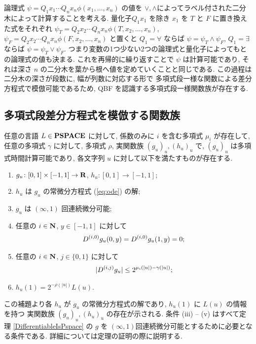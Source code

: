 論理式 $\psi = Q_1 x_1 \cdots Q_n x_n \phi(x_1, \dots, x_n)$ の値を
$\vee, \wedge$によってラベル付された二分木によって計算することを考える. 
量化子$Q_1 x_1$ を除き $x_1$ を $T$ と $F$ に置き換えた式をそれぞれ
$\psi_T = Q_2 x_2 \cdots Q_n x_n \phi(T, x_2, \dots, x_n)$,
$\psi_F = Q_2 x_2 \cdots Q_n x_n \phi(F, x_2, \dots, x_n)$ と置くと
$Q_1=\forall$ ならば $\psi = \psi_T \wedge \psi_F$, 
$Q_1=\exists$ ならば $\psi = \psi_T \vee \psi_F$.
つまり変数の1つ少ない2つの論理式と量化子によってもとの論理式の値も決まる.
これを再帰的に繰り返すことで $\psi$ は計算可能であり, 
それは深さ $n$ の二分木を葉から根へ値を定めていくことと同じである.
この過程は二分木の深さが段数に, 幅が列数に対応する形で
多項式段一様な関数による差分方程式で模倣可能であるため,
\textsf{QBF} を認識する多項式段一様関数族が存在する.


\subsection{多項式段差分方程式を模倣する関数族}


\begin{lemma}
 \label{DifferentiableFamily}
 任意の言語 $L \in \mathbf{PSPACE}$ に対して, 
 係数のみに $i$ を含む多項式 $\mu_i$ が存在して,
 任意の多項式 $\gamma$ に対して,
 多項式 $\rho$, 実関数族 $(g_u)_u, (h_u)_u$ で, 
 $(g_u)_u$ は多項式時間計算可能であり,
 各文字列 $u$ に対して以下を満たすものが存在する.
 \begin{enumerate}
  \item $g_u\colon [0,1] \times [-1,1]\to \mathbf R$, $h_u\colon [0,1] \to [-1,1]$;
  \item $h_u$ は $g_u$ の常微分方程式 (\ref{eq:ode}) の解; 
  \item $g_u$ は $(\infty, 1)$ 回連続微分可能;
  \item 任意の $i \in \mathbf N$, $y \in [-1,1]$ に対して
	\begin{equation*}
	 D ^{(i, 0)} g_u(0,y) = D ^{(i, 0)} g_u(1,y) = 0;
	\end{equation*}
  \item \label{enum:infty1}
	任意の $i \in \mathbf N$, $j \in \{0,1\}$ に対して
	\begin{equation*}
	 |D ^{(i,j)} g_u| \leq 2^{\mu_i (|u|) - \gamma(|u|)};
	\end{equation*}
  \item $h_u(1) = 2^{-\rho(|u|)}L(u)$.
 \end{enumerate}
\end{lemma}

 この補題より各 $h_u$ が $g_u$ の常微分方程式の解であり, 
 $h_u(1)$ に $L(u)$ の情報を持つ
 実関数族 $(g_u)_u, (h_u)_u$ の存在が示される.
 条件 (iii) -- (v) はすべて定理 \ref{DifferentiableIsPspace} の $g$ を
 $(\infty, 1)$回連続微分可能とするために必要となる条件である.
 詳細については定理の証明の際に説明する.
 

